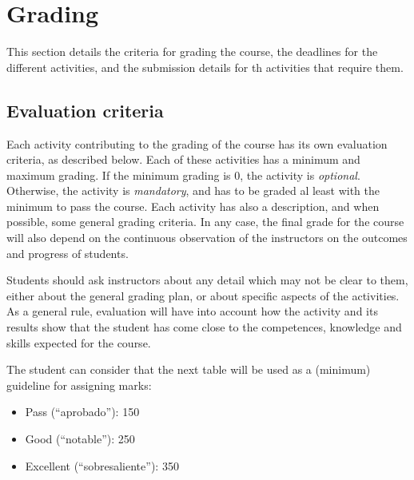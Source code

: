 \documentclass[a4paper]{article}
\begin{document}
\section{Grading}

This section details the criteria for grading the course, the deadlines for the different activities, and the submission details for th activities that require them.

\subsection{Evaluation criteria}
\label{sub:evaluation-criteria}

Each activity contributing to the grading of the course has its own evaluation criteria, 
as described below. Each of these activities has a minimum and maximum grading. If the 
minimum grading is 0, the activity is \textit{optional}. Otherwise, the activity is \textit{mandatory}, and 
has to be graded al least with the minimum to pass the course. Each activity has also a 
description, and when possible, some general grading criteria. In any case, the final grade 
for the course will also depend on the continuous observation of the instructors on the 
outcomes and progress of students.

Students should ask instructors about any detail which may not be clear to them, 
either about the general grading plan, or about specific aspects of the activities. 
As a general rule, evaluation will have into account how the activity and its results 
show that the student has come close to the competences, knowledge and skills expected 
for the course.

The student can consider that the next table will be used as a (minimum) guideline for 
assigning marks:

\begin{itemize}
\item Pass (``aprobado''): 150
\item Good (``notable''): 250
\item Excellent (``sobresaliente''): 350
\end{itemize}
\end{document}
